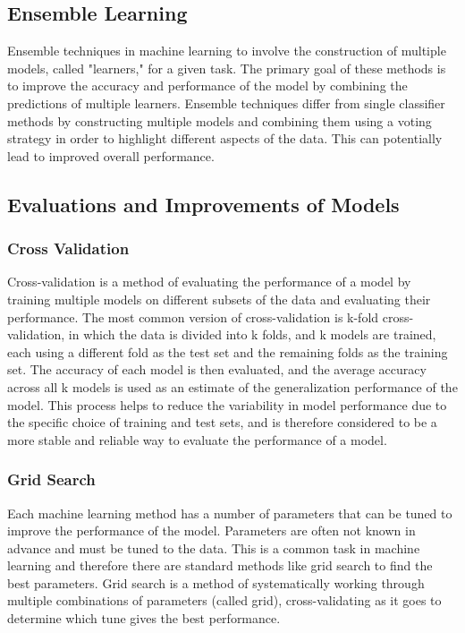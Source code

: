 \subsection{Ensemble Learning}
Ensemble techniques in machine learning to involve the construction of multiple models, called "learners," for a given task. The primary goal of these methods is to improve the accuracy and performance of the model by combining the predictions of multiple learners. Ensemble techniques differ from single classifier methods by constructing multiple models and combining them using a voting strategy in order to highlight different aspects of the data. This can potentially lead to improved overall performance. \cite[p. 253]{shaik_briefsurveyrandom_2019}

\subsection{Evaluations and Improvements of Models}
\subsubsection{Cross Validation}
Cross-validation is a method of evaluating the performance of a model by training multiple models on different subsets of the data and evaluating their performance. The most common version of cross-validation is k-fold cross-validation, in which the data is divided into k folds, and k models are trained, each using a different fold as the test set and the remaining folds as the training set. 
The accuracy of each model is then evaluated, and the average accuracy across all k models is used as an estimate of the generalization performance of the model. This process helps to reduce the variability in model performance due to the specific choice of training and test sets, and is therefore considered to be a more stable and reliable way to evaluate the performance of a model. 
\cite[p. 252-260]{muller_introductionmachinelearning_2016}

\subsubsection{Grid Search}
Each machine learning method has a number of parameters that can be tuned to improve the performance of the model. Parameters are often not known in advance and must be tuned to the data. 
This is a common task in machine learning and therefore there are standard methods like grid search to find the best parameters. 
Grid search is a method of systematically working through multiple combinations of parameters (called grid), cross-validating as it goes to determine which tune gives the best performance.
\cite[p. 260-275]{muller_introductionmachinelearning_2016}


